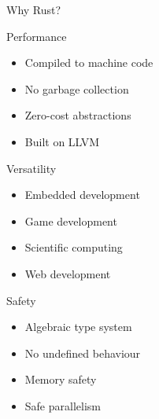 \documentclass[8pt, aspectratio=169]{beamer}
\begin{document}
\begin{frame}{Why Rust?}
\begin{block}{Performance}
\begin{multicols}{2}
\begin{itemize}
\item Compiled to machine code
\item No garbage collection
\end{itemize}
\columnbreak
\begin{itemize}
\item Zero-cost abstractions
\item Built on LLVM
\end{itemize}
\end{multicols}
\end{block}
\begin{block}{Versatility}
\begin{multicols}{2}
\begin{itemize}
\item Embedded development
\item Game development
\end{itemize}
\columnbreak
\begin{itemize}
\item Scientific computing
\item Web development
\end{itemize}
\end{multicols}
\end{block}
\begin{block}{Safety}
\begin{multicols}{2}
\begin{itemize}
\item Algebraic type system
\item No undefined behaviour
\end{itemize}
\columnbreak
\begin{itemize}
\item Memory safety
\item Safe parallelism
\end{itemize}
\end{multicols}
\end{block}
\end{frame}
\end{document}
